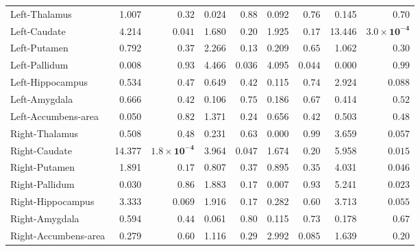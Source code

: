 \begin{tabular}{lrrrrrrrr}
Left-Thalamus & 1.007 & $0.32$ & 0.024 & $0.88$ & 0.092 & $0.76$ & 0.145 & $0.70$ \\
Left-Caudate & 4.214 & $0.041$ & 1.680 & $0.20$ & 1.925 & $0.17$ & 13.446 & $\mathbf{3.0{\times}10^{-4}}$ \\
Left-Putamen & 0.792 & $0.37$ & 2.266 & $0.13$ & 0.209 & $0.65$ & 1.062 & $0.30$ \\
Left-Pallidum & 0.008 & $0.93$ & 4.466 & $0.036$ & 4.095 & $0.044$ & 0.000 & $0.99$ \\
Left-Hippocampus & 0.534 & $0.47$ & 0.649 & $0.42$ & 0.115 & $0.74$ & 2.924 & $0.088$ \\
Left-Amygdala & 0.666 & $0.42$ & 0.106 & $0.75$ & 0.186 & $0.67$ & 0.414 & $0.52$ \\
Left-Accumbens-area & 0.050 & $0.82$ & 1.371 & $0.24$ & 0.656 & $0.42$ & 0.503 & $0.48$ \\
Right-Thalamus & 0.508 & $0.48$ & 0.231 & $0.63$ & 0.000 & $0.99$ & 3.659 & $0.057$ \\
Right-Caudate & 14.377 & $\mathbf{1.8{\times}10^{-4}}$ & 3.964 & $0.047$ & 1.674 & $0.20$ & 5.958 & $0.015$ \\
Right-Putamen & 1.891 & $0.17$ & 0.807 & $0.37$ & 0.895 & $0.35$ & 4.031 & $0.046$ \\
Right-Pallidum & 0.030 & $0.86$ & 1.883 & $0.17$ & 0.007 & $0.93$ & 5.241 & $0.023$ \\
Right-Hippocampus & 3.333 & $0.069$ & 1.916 & $0.17$ & 0.282 & $0.60$ & 3.713 & $0.055$ \\
Right-Amygdala & 0.594 & $0.44$ & 0.061 & $0.80$ & 0.115 & $0.73$ & 0.178 & $0.67$ \\
Right-Accumbens-area & 0.279 & $0.60$ & 1.116 & $0.29$ & 2.992 & $0.085$ & 1.639 & $0.20$ \\
\bottomrule
\end{tabular}
